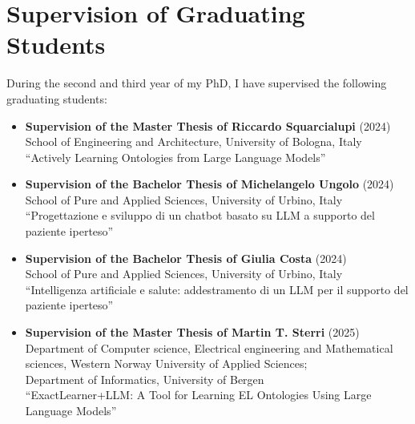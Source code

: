 \documentclass[11pt]{article}
\begin{document}
\section{Supervision of Graduating Students}\label{sec:supervision-of-graduating-students}
%
During the second and third year of my PhD, I have supervised the following graduating students:
%
\begin{itemize}
	\item \textbf{Supervision of the Master Thesis of Riccardo Squarcialupi} (2024)
	\\School of Engineering and Architecture, University of Bologna, Italy
	\\``Actively Learning Ontologies from Large Language Models''
	\item \textbf{Supervision of the Bachelor Thesis of Michelangelo Ungolo} (2024)
	\\School of Pure and Applied Sciences, University of Urbino, Italy
	\\``Progettazione e sviluppo di un chatbot basato su LLM a supporto del paziente iperteso''
	\item \textbf{Supervision of the Bachelor Thesis of Giulia Costa} (2024)
	\\School of Pure and Applied Sciences, University of Urbino, Italy
	\\``Intelligenza artificiale e salute: addestramento di un LLM per il supporto del paziente iperteso''
	\item \textbf{Supervision of the Master Thesis of Martin T. Sterri} (2025)
	\\Department of Computer science, Electrical engineering and Mathematical sciences, Western Norway University of Applied Sciences;
	\\Department of Informatics, University of Bergen
	\\``ExactLearner+LLM: A Tool for Learning EL Ontologies Using Large Language Models''
\end{itemize}
\end{document}
